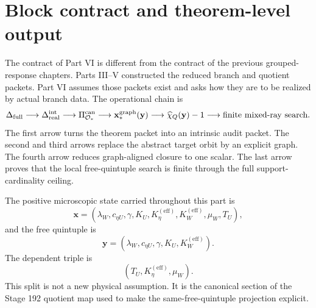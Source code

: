 
\section{Block contract and theorem-level output}
\label{sec:app-part06-block-contract}

The contract of Part VI is different from the contract of the previous grouped-response chapters.  Parts III--V constructed the reduced branch and quotient packets.  Part VI assumes those packets exist and asks how they are to be realized by actual branch data.  The operational chain is
\begin{equation}
\label{eq:app-part06-operational-chain}
\Delta_{\rm full}
\longrightarrow
\Delta_{\rm real}^{\rm int}
\longrightarrow
\Pi_{\mathcal O_*}^{\rm can}
\longrightarrow
\mathbf x_*^{\rm graph}(\mathbf y)
\longrightarrow
\widehat\chi_Q(\mathbf y)-1
\longrightarrow
\text{finite mixed-ray search.}
\end{equation}
The first arrow turns the theorem packet into an intrinsic audit packet.  The second and third arrows replace the abstract target orbit by an explicit graph.  The fourth arrow reduces graph-aligned closure to one scalar.  The last arrow proves that the local free-quintuple search is finite through the full support-cardinality ceiling.

The positive microscopic state carried throughout this part is
\begin{equation}
\label{eq:app-part06-state-x}
\mathbf x=
\left(
\lambda_W,
 c_{\eta U},
 \gamma,
 K_U,
 K_\eta^{(\mathrm{eff})},
 K_W^{(\mathrm{eff})},
 \mu_W,
 T_U
\right),
\end{equation}
and the free quintuple is
\begin{equation}
\label{eq:app-part06-free-quintuple}
\mathbf y=
\left(
\lambda_W,
 c_{\eta U},
 \gamma,
 K_U,
 K_W^{(\mathrm{eff})}
\right).
\end{equation}
The dependent triple is
\begin{equation}
\label{eq:app-part06-dependent-triple}
(T_U,
 K_\eta^{(\mathrm{eff})},
 \mu_W).
\end{equation}
This split is not a new physical assumption.  It is the canonical section of the Stage 192 quotient map used to make the same-free-quintuple projection explicit.

